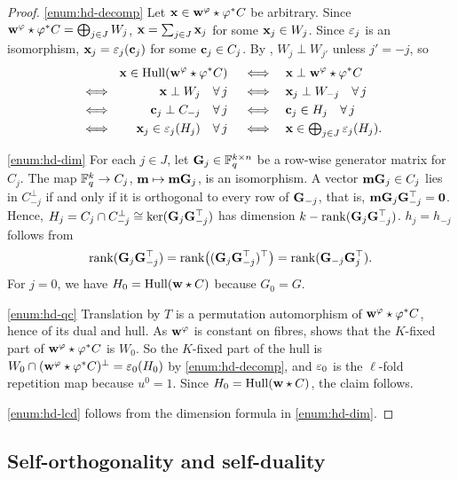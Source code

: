 \documentclass[twocolumn, 11pt]{scrartcl}
\begin{document}
\begin{proof}
    \ref{enum:hd-decomp} Let $\bfx\in\bfw^\varphi\star\varphi^*C$ be arbitrary. Since $\bfw^\varphi\star\varphi^*C=\bigoplus_{j\in J} W_j$, $\bfx=\sum_{j\in J}\bfx_j$ for some $\bfx_j\in W_j$. Since $\eps_j$ is an isomorphism, $\bfx_j=\eps_{j}(\bfc_j)$ for some $\bfc_j\in C_j$. By , $W_j\perp W_{j'}$ unless $j'=-j$, so
    \begin{alignat*}{2}
        &&\hspace{-2em} \bfx\in\Hull(\bfw^\varphi\star\varphi^*C)
        \qiff& \bfx\perp\bfw^\varphi\star \varphi^*C \\
        &\iff\quad& \bfx\perp W_j\quad\forall j
        \qiff& \bfx_j\perp W_{-j}\quad\forall j \\
        &\iff\quad& \bfc_j\perp C_{-j}\quad\forall j
        \qiff& \bfc_j\in H_j\quad\forall j \\
        &\iff\quad& \bfx_j\in\eps_j(H_j)\quad\forall j
        \qiff& \textstyle \bfx\in\bigoplus_{j\in J}\eps_j(H_j).
    \end{alignat*}

    \ref{enum:hd-dim} For each $j\in J$, let $\bfG_j\in\bbF_q^{k\times n}$ be a row-wise generator matrix for $C_j$. The map $\bbF_q^k\to C_j$, $\bfm\mapsto\bfm\bfG_j$, is an isomorphism. A vector $\bfm\bfG_j\in C_j$ lies in $C_{-j}^\perp$ if and only if it is orthogonal to every row of $\bfG_{-j}$, that is, $\bfm\bfG_j\bfG_{-j}^\top=\bf0$. Hence, $H_j=C_j\cap C_{-j}^\perp\cong\ker(\bfG_j\bfG_{-j}^\top)$ has dimension $k-\rank(\bfG_j\bfG_{-j}^\top)$. $h_j=h_{-j}$ follows from
    \[ \rank(\bfG_j\bfG_{-j}^\top)=\rank\pa[\big]{(\bfG_j\bfG_{-j}^\top)^\top}=\rank(\bfG_{-j}\bfG_j^\top). \]
    For $j=0$, we have $H_0=\Hull(\bfw\star C)$ because $G_0=G$.
    
    \ref{enum:hd-qc} Translation by $T$ is a permutation automorphism of $\bfw^\varphi\star\varphi^*C$, hence of its dual and hull. As $\bfw^\varphi$ is constant on fibres,  shows that the $K$-fixed part of $\bfw^\varphi\star\varphi^*C$ is $W_0$. So the $K$-fixed part of the hull is $W_0\cap(\bfw^\varphi\star\varphi^*C)^\perp=\eps_0(H_0)$ by \ref{enum:hd-decomp}, and $\eps_0$ is the $\ell$-fold repetition map because $u^0=1$. Since $H_0=\Hull(\bfw\star C)$, the claim follows.
    
    \ref{enum:hd-lcd} follows from the dimension formula in \ref{enum:hd-dim}.
\end{proof}

\subsection{Self-orthogonality and self-duality} \label{subsection:self-dual}
\end{document}
